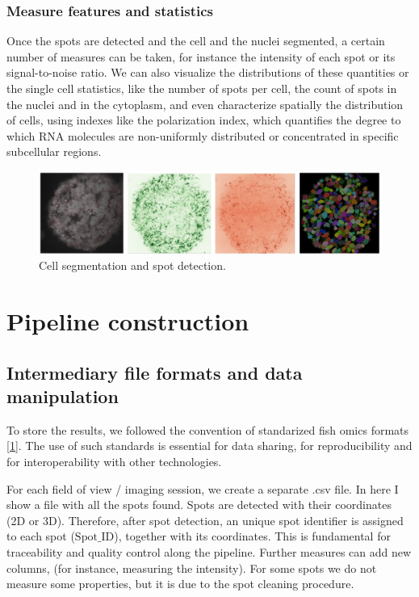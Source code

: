 \documentclass[24pt]{article}
\begin{document}
\subsubsection{Measure features and statistics} 

Once the spots are detected and the cell and the nuclei segmented, a certain number of measures can be taken, for instance the intensity of each spot or its signal-to-noise ratio. We can also visualize the distributions of these quantities or the single cell statistics, like the number of spots per cell, the count of spots in the nuclei and in the cytoplasm, and even characterize spatially the distribution of cells, using indexes like the polarization index, which quantifies the degree to which RNA molecules are non-uniformly distributed or concentrated in specific subcellular regions.


 
  
  \begin{figure}[h!!] %
  \centering
  \includegraphics[width=.8\textwidth]{pipeline_raw_data_results.png} %
  \caption{Cell segmentation and spot detection.}
  \label{fig:Raw_data} %
\end{figure} 


 \newpage


\section{Pipeline construction}

\subsection{Intermediary file formats and data manipulation} 

To store the results, we followed the convention of  standarized fish omics formats \href{https://fish-omics-format.readthedocs.io/en/latest/intro.html}{[1]}.
The use of such standards is essential for data sharing, for reproducibility and for interoperability with other technologies. 


For each field of view / imaging session, we create a separate .csv file. In here I show a file with all the spots found.  Spots are detected with their coordinates (2D or 3D). Therefore, after spot detection, an unique spot identifier is assigned to each spot ($\text{Spot\_ID}$),  together with its coordinates.  This is fundamental for traceability and quality control along the pipeline. Further measures can add new columns, (for instance, measuring the intensity). For some spots we do not measure some properties, but it is due to the spot cleaning procedure. 
\end{document}
